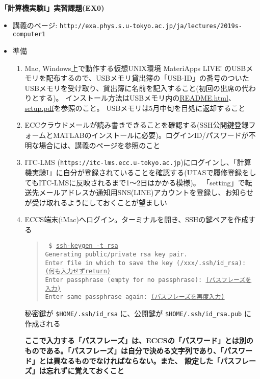 \documentclass[11pt]{jarticle}
\begin{document}
\noindent
{\bf\large 「計算機実験I」実習課題(EX0)}
\\[-0.5em]

\noindent
\begin{itemize}
\item 講義のページ: \verb+http://exa.phys.s.u-tokyo.ac.jp/ja/lectures/2019s-computer1+

\item 準備
  \begin{enumerate}
  \item Mac, Windows上で動作する仮想UNIX環境 MateriApps LIVE! のUSBメモリを配布するので、USBメモリ貸出簿の「USB-ID」の番号のついたUSBメモリを受け取り、貸出簿に名前を記入すること(初回の出席の代わりとする)。
    インストール方法はUSBメモリ内の\href{https://github.com/cmsi/MateriAppsLive/wiki/MateriAppsLive-ltx}{README.html}、\href{https://github.com/cmsi/MateriAppsLive-setup/blob/master/ova/setup.pdf}{setup.pdf}を参照のこと。
    USBメモリは5月中旬を目処に返却すること

  \item ECCクラウドメールが読み書きできることを確認する(SSH公開鍵登録フォームとMATLABのインストールに必要)。ログインID/パスワードが不明な場合には、講義のページを参照のこと
  \item ITC-LMS (\verb+https://itc-lms.ecc.u-tokyo.ac.jp+)にログインし、「計算機実験I」に自分が登録されていることを確認する(UTASで履修登録をしてもITC-LMSに反映されるまで1〜2日はかかる模様)。
    「setting」で転送先メールアドレスか通知用SNS(LINE)アカウントを登録し、お知らせが受け取れるようにしておくことが望ましい
    
  \item ECCS端末(iMac)へログイン。ターミナルを開き、SSHの鍵ペアを作成する
    \begin{quote} \tt
      \$ \underline{ssh-keygen -t rsa} \\
      Generating public/private rsa key pair.\\
      Enter file in which to save the key (/xxx/.ssh/id\_rsa): \underline{(何も入力せずreturn)}\\
      Enter passphrase (empty for no passphrase): \underline{(パスフレーズを入力)}\\
      Enter same passphrase again: \underline{(パスフレーズを再度入力)}
    \end{quote}
    秘密鍵が {\tt \$HOME/.ssh/id\_rsa} に、公開鍵が {\tt \$HOME/.ssh/id\_rsa.pub} に作成される
    
    {\bf ここで入力する「パスフレーズ」は、ECCSの「パスワード」とは別のものである。「パスフレーズ」は自分で決める文字列であり、「パスワード」とは異なるものでなければならない。また、{\color{red} 設定した「パスフレーズ」は忘れずに覚えておくこと}}


\end{enumerate}
\end{itemize}
\end{document}
